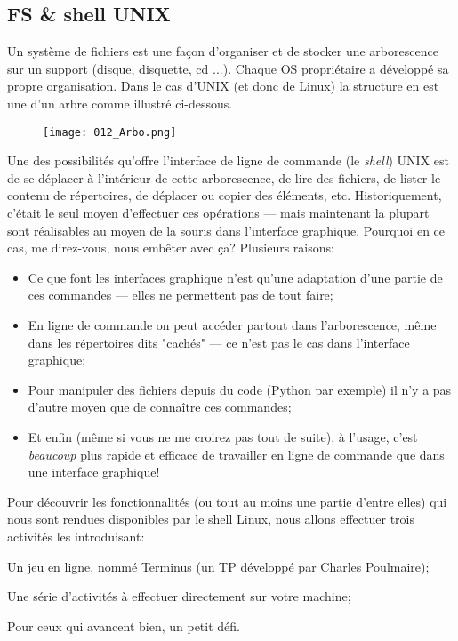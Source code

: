 \documentclass[12pt]{article}
\begin{document}
	 
	 \subsection{FS \& shell UNIX}
	 
	 Un système de fichiers est une façon d'organiser et de stocker une arborescence sur un support (disque, disquette, cd ...). Chaque OS propriétaire a développé sa propre organisation. Dans le cas d'UNIX (et donc de Linux) la structure en est une d'un arbre comme illustré ci-dessous.
	
	\begin{figure}[H]
		\centering
		\texttt{[image: 012\_Arbo.png]}
	\end{figure}
	
	Une des possibilités qu'offre l'interface de ligne de commande (le \textit{shell}) UNIX est de se déplacer à l'intérieur de cette arborescence, de lire des fichiers, de lister le contenu de répertoires, de déplacer ou copier des éléments, etc. Historiquement, c'était le seul moyen d'effectuer ces opérations --- mais maintenant la plupart sont réalisables au moyen de la souris dans l'interface graphique. Pourquoi en ce cas, me direz-vous, nous embêter avec ça? Plusieurs raisons:
	\begin{itemize}
		\item Ce que font les interfaces graphique n'est qu'une adaptation d'une partie de ces commandes --- elles ne permettent pas de tout faire;
		\item En ligne de commande on peut accéder partout dans l'arborescence, même dans les répertoires dits "cachés" --- ce n'est pas le cas dans l'interface graphique;
		\item Pour manipuler des fichiers depuis du code (Python par exemple) il n'y a pas d'autre moyen que de connaître ces commandes;
		\item Et enfin (même si vous ne me croirez pas tout de suite), à l'usage, c'est \textit{beaucoup} plus rapide et efficace de travailler en ligne de commande que dans une interface graphique!
	\end{itemize}
	
	Pour découvrir les fonctionnalités (ou tout au moins une partie d'entre elles) qui nous sont rendues disponibles par le shell Linux, nous allons effectuer trois activités les introduisant:
	\begin{alphenum}
		\item Un jeu en ligne, nommé Terminus (un TP développé par Charles Poulmaire);
		\item Une série d'activités à effectuer directement sur votre machine;
		\item Pour ceux qui avancent bien, un petit défi.
	\end{alphenum}
	
\end{document}
